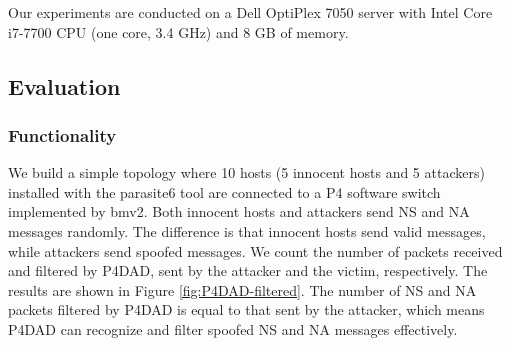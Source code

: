 \documentclass[journal]{IEEEtran}
\begin{document}
        Our experiments are conducted on a Dell OptiPlex 7050 server with Intel Core i7-7700 CPU (one core, 3.4 GHz) and 8 GB of memory.


    \subsection{Evaluation}



        \subsubsection{Functionality}
            We build a simple topology where 10 hosts (5 innocent hosts and 5 attackers) installed with the parasite6 tool are connected to a P4 software switch implemented by bmv2. 
            Both innocent hosts and attackers send NS and NA messages randomly. The difference is that innocent hosts send valid messages, while attackers send spoofed messages.
            We count the number of packets received and filtered by P4DAD, sent by the attacker and the victim, respectively. The results are shown in Figure \ref{fig:P4DAD-filtered}. The number of NS and NA packets filtered by P4DAD is equal to that sent by the attacker, which means P4DAD can recognize and filter spoofed NS and NA messages effectively.
\end{document}
